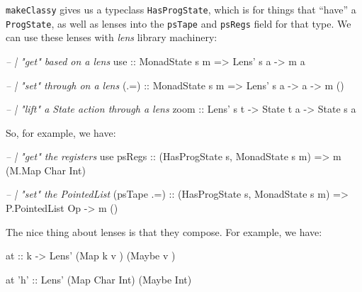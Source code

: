 \documentclass[]{article}
\newenvironment{Shaded}{}{}
\newcommand{\CharTok}[1]{\textcolor[rgb]{0.25,0.44,0.63}{#1}}
\newcommand{\CommentTok}[1]{\textcolor[rgb]{0.38,0.63,0.69}{\textit{#1}}}
\newcommand{\DataTypeTok}[1]{\textcolor[rgb]{0.56,0.13,0.00}{#1}}
\newcommand{\FunctionTok}[1]{\textcolor[rgb]{0.02,0.16,0.49}{#1}}
\newcommand{\NormalTok}[1]{#1}
\newcommand{\OtherTok}[1]{\textcolor[rgb]{0.00,0.44,0.13}{#1}}
\begin{document}
\texttt{makeClassy} gives us a typeclass \texttt{HasProgState}, which is for
things that ``have'' a \texttt{ProgState}, as well as lenses into the
\texttt{psTape} and \texttt{psRegs} field for that type. We can use these lenses
with \emph{lens} library machinery:

\begin{Shaded}
\begin{Highlighting}[]
\CommentTok{-- | "get" based on a lens}
\OtherTok{use   ::} \DataTypeTok{MonadState}\NormalTok{ s m }\OtherTok{=>} \DataTypeTok{Lens'}\NormalTok{ s a }\OtherTok{->}\NormalTok{ m a}

\CommentTok{-- | "set" through on a lens}
\OtherTok{(.=)  ::} \DataTypeTok{MonadState}\NormalTok{ s m }\OtherTok{=>} \DataTypeTok{Lens'}\NormalTok{ s a }\OtherTok{->}\NormalTok{ a }\OtherTok{->}\NormalTok{ m ()}

\CommentTok{-- | "lift" a State action through a lens}
\OtherTok{zoom  ::} \DataTypeTok{Lens'}\NormalTok{ s t }\OtherTok{->} \DataTypeTok{State}\NormalTok{ t a }\OtherTok{->} \DataTypeTok{State}\NormalTok{ s a}
\end{Highlighting}
\end{Shaded}

So, for example, we have:

\begin{Shaded}
\begin{Highlighting}[]
\CommentTok{-- | "get" the registers}
\NormalTok{use}\OtherTok{ psRegs  ::}\NormalTok{ (}\DataTypeTok{HasProgState}\NormalTok{ s, }\DataTypeTok{MonadState}\NormalTok{ s m) }\OtherTok{=>}\NormalTok{ m (}\DataTypeTok{M.Map} \DataTypeTok{Char} \DataTypeTok{Int}\NormalTok{)}

\CommentTok{-- | "set" the PointedList}
\NormalTok{(psTape }\FunctionTok{.=}\NormalTok{)}\OtherTok{ ::}\NormalTok{ (}\DataTypeTok{HasProgState}\NormalTok{ s, }\DataTypeTok{MonadState}\NormalTok{ s m) }\OtherTok{=>} \DataTypeTok{P.PointedList} \DataTypeTok{Op} \OtherTok{->}\NormalTok{ m ()}
\end{Highlighting}
\end{Shaded}

The nice thing about lenses is that they compose. For example, we have:

\begin{Shaded}
\begin{Highlighting}[]
\OtherTok{at ::}\NormalTok{ k }\OtherTok{->} \DataTypeTok{Lens'}\NormalTok{ (}\DataTypeTok{Map}\NormalTok{ k    v  ) (}\DataTypeTok{Maybe}\NormalTok{ v  )}

\NormalTok{at }\CharTok{'h'}\OtherTok{  ::} \DataTypeTok{Lens'}\NormalTok{ (}\DataTypeTok{Map} \DataTypeTok{Char} \DataTypeTok{Int}\NormalTok{) (}\DataTypeTok{Maybe} \DataTypeTok{Int}\NormalTok{)}
\end{Highlighting}
\end{Shaded}
\end{document}
